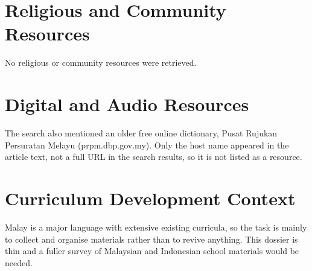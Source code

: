\documentclass[12pt]{article}
\begin{document}
\section{Religious and Community Resources}
No religious or community resources were retrieved.

\section{Digital and Audio Resources}
The search also mentioned an older free online dictionary, Pusat Rujukan Persuratan Melayu (prpm.dbp.gov.my). Only the host name appeared in the article text, not a full URL in the search results, so it is not listed as a resource.

\section{Curriculum Development Context}
Malay is a major language with extensive existing curricula, so the task is mainly to collect and organise materials rather than to revive anything. This dossier is thin and a fuller survey of Malaysian and Indonesian school materials would be needed.
\end{document}
